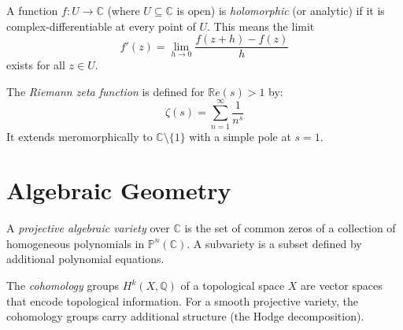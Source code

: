 \begin{definition}
A function $f: U \to \mathbb{C}$ (where $U \subseteq \mathbb{C}$ is open) is \textit{holomorphic} (or analytic) if it is complex-differentiable at every point of $U$. This means the limit
\[
f'(z) = \lim_{h \to 0} \frac{f(z + h) - f(z)}{h}
\]
exists for all $z \in U$.
\end{definition}

\begin{definition}
The \textit{Riemann zeta function} is defined for $\mathbb{R}e(s) > 1$ by:
\[
\zeta(s) = \sum_{n=1}^\infty \frac{1}{n^s}
\]
It extends meromorphically to $\mathbb{C} \setminus \{1\}$ with a simple pole at $s = 1$.
\end{definition}

\section{Algebraic Geometry}

\begin{definition}
A \textit{projective algebraic variety} over $\mathbb{C}$ is the set of common zeros of a collection of homogeneous polynomials in $\mathbb{P}^n(\mathbb{C})$. A subvariety is a subset defined by additional polynomial equations.
\end{definition}

\begin{definition}
The \textit{cohomology} groups $H^k(X, \mathbb{Q})$ of a topological space $X$ are vector spaces that encode topological information. For a smooth projective variety, the cohomology groups carry additional structure (the Hodge decomposition).
\end{definition}
